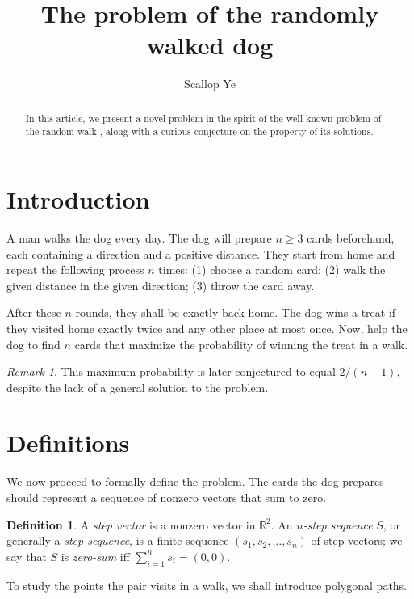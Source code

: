 \documentclass{amsart}
\title{The problem of the randomly walked dog}
\author{Scallop Ye}
\theoremstyle{definition}
\newtheorem{definition}[proposition]{Definition}
\theoremstyle{problem}
\theoremstyle{remark}
\newtheorem*{remark}{Remark}
\begin{document}
\begin{abstract}
    In this article, we present a novel problem in the spirit of
    the well-known problem of the random walk \cite{pearson},
    along with a curious conjecture on the property of its solutions.
\end{abstract}

\maketitle

\section{Introduction}

A man walks the dog every day. The dog will prepare $n\ge3$ cards beforehand,
each containing a direction and a positive distance.
They start from home and repeat the following process $n$ times:
(1) choose a random card; (2) walk the given distance in the given direction; (3) throw the card away.

After these $n$ rounds, they shall be exactly back home. The dog wins a treat
if they visited home exactly twice and any other place at most once.
Now, help the dog to find $n$ cards that maximize the probability
of winning the treat in a walk.

\begin{remark}
    This maximum probability is later conjectured to equal
    $2/(n-1)$, despite the lack of a general solution to the problem.
\end{remark}

\section{Definitions}

We now proceed to formally define the problem.
The cards the dog prepares should represent
a sequence of nonzero vectors that sum to zero.

\begin{definition}
    A \emph{step vector} is a nonzero vector in $\mathbb{R}^2$.
    An \emph{$n$-step sequence} $S$, or generally a \emph{step sequence},
    is a finite sequence $(s_1,s_2,\dots,s_n)$ of step vectors;
    we say that $S$ is \emph{zero-sum} iff $\sum_{i=1}^{n}s_i=(0,0)$.
\end{definition}

To study the points the pair visits in a walk,
we shall introduce polygonal paths.
\end{document}
